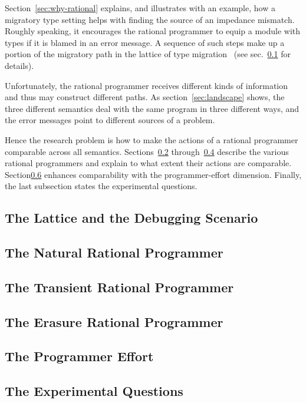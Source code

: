 
Section~\ref{sec:why-rational} explains, and illustrates with an example, how a
migratory type setting helps with finding the source of an impedance
mismatch. Roughly speaking, it encourages the rational programmer to equip a
module with types if it is blamed in an error message. A sequence of such steps
make up a portion of the migratory path in the lattice of type
migration~\cite{tfgnvf-popl-2016} (see sec.~\ref{sub:stuff} for details).

Unfortunately, the rational programmer receives different kinds of information
and thus may construct different paths. As section~\ref{sec:landscape} shows,
the three different semantics deal with the same program in three different
ways, and the error messages point to different sources of a problem.

Hence the research problem is how to make the actions of a rational programmer
comparable across all semantics. Sections~\ref{sub:natural}
through~\ref{sub:erasure} describe the various rational programmers and explain
to what extent their actions are comparable. Section\ref{sub:experiment}
enhances comparability with the programmer-effort dimension. Finally, the last
subsection states the experimental questions. 

\def\rsub#1#2{\subsection{#2} \label{sub:#1} }

\rsub{stuff}     {The Lattice and the Debugging Scenario} 
\rsub{natural}   {The Natural Rational Programmer} 
\rsub{transient} {The Transient Rational Programmer} 
\rsub{erasure}   {The Erasure Rational Programmer} 
\rsub{effort}    {The Programmer Effort} \label{subsec:effort}
\rsub{experiment}{The Experimental Questions} 
